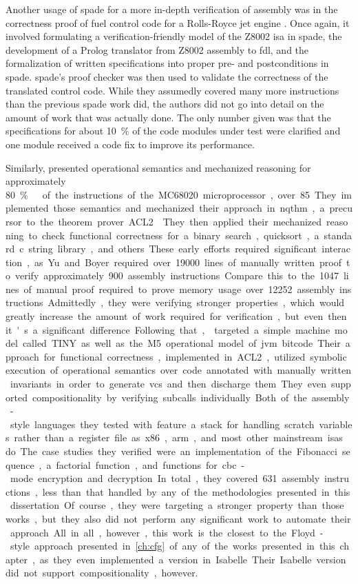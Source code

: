 Another usage of \ac{spade} for a more in-depth verification of assembly
was in the correctness proof of fuel control code for a Rolls-Royce
jet engine \autocite{oneill1988verification}. Once again,
it involved formulating a verification-friendly model of the Z8002 \ac{isa}
in \ac{spade}, the development of a Prolog translator from Z8002 assembly to \ac{fdl},
and the formalization of written specifications into proper pre- and postconditions
in \ac{spade}. \Ac{spade}'s proof checker was then used to validate the correctness
of the translated control code. While they assumedly covered many more instructions
than the previous \ac{spade} work did, the authors did not go into detail
on the amount of work that was actually done.
The only number given was that the specifications for about \SI{10}{\percent}
of the code modules under test were clarified
and one module received a code fix to improve its performance.

Similarly, \textcite{yu1993automated,boyer1996automated}
presented operational semantics and mechanized reasoning
for approximately \SI{80}\percent\ of the instructions of the MC68020 microprocessor, over \num{85}.
They implemented those semantics and mechanized their approach
in \ac{nqthm}, a precursor to the theorem prover ACL2 \autocite{ACL2}.
They then applied their mechanized reasoning to check functional correctness
for a binary search, quicksort, a standard \gls{c} string library, and others.
These early efforts required significant interaction,
as Yu and Boyer required over \num{19000}
lines of manually written proof to verify approximately \num{900} assembly instructions.
Compare this to the \num{1047} lines of manual proof
required to prove memory usage over \num{12252} assembly instructions.
Admittedly, they were verifying stronger properties,
which would greatly increase the amount of work required for verification,
but even then it's a significant difference.

Following that, \textcite{matthews2006verification}
targeted a simple machine model called TINY
as well as the M5 operational model of \ac{jvm} bitcode.
Their approach for functional correctness, implemented in ACL2,
utilized symbolic execution of operational semantics
over code annotated with manually written invariants
in order to generate \acp{vc} and then discharge them.
They even supported compositionality by verifying subcalls individually.
Both of the assembly-style languages they tested with feature a stack
for handling scratch variables rather than a register file
as \gls{x86}, \gls{arm}, and most other mainstream \acp{isa} do.
The case studies they verified were an implementation of the Fibonacci sequence,
a factorial function, and functions for \ac{cbc}-mode encryption and decryption.
In total, they covered \num{631} assembly instructions,
less than that handled by any of the methodologies presented in this dissertation.
Of course, they were targeting a stronger property than those works,
but they also did not perform any significant work to automate their approach.
All in all, however, this work is the closest to the Floyd-style approach
presented in \cref{ch:cfg} of any of the works presented in this chapter,
as they even implemented a version in Isabelle. Their Isabelle version did not support
compositionality, however.

